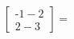 \documentclass[preview]{standalone}
\begin{document}
\begin{align*}
\begin{bmatrix} \text{-}1 - 2 \\ 2 - 3 \end{bmatrix} =
\end{align*}
\end{document}

